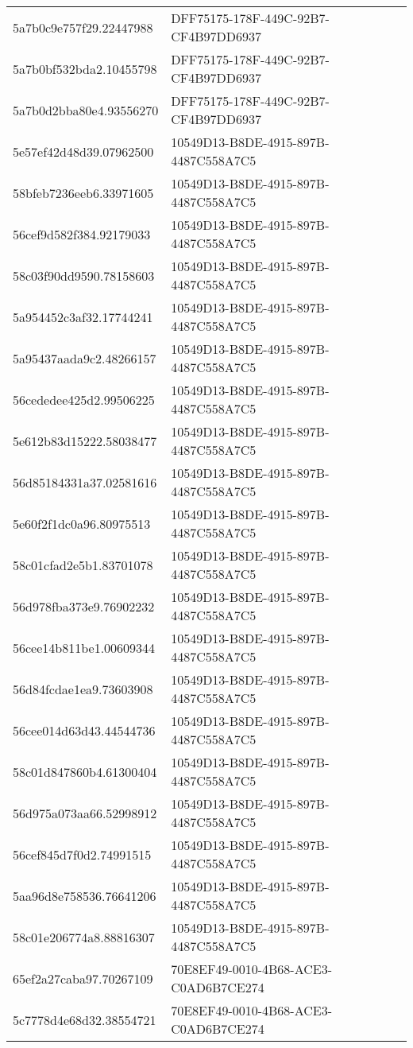 \begin{tabular}{ll}
5a7b0c9e757f29.22447988 & DFF75175-178F-449C-92B7-CF4B97DD6937 \\
5a7b0bf532bda2.10455798 & DFF75175-178F-449C-92B7-CF4B97DD6937 \\
5a7b0d2bba80e4.93556270 & DFF75175-178F-449C-92B7-CF4B97DD6937 \\
5e57ef42d48d39.07962500 & 10549D13-B8DE-4915-897B-4487C558A7C5 \\
58bfeb7236eeb6.33971605 & 10549D13-B8DE-4915-897B-4487C558A7C5 \\
56cef9d582f384.92179033 & 10549D13-B8DE-4915-897B-4487C558A7C5 \\
58c03f90dd9590.78158603 & 10549D13-B8DE-4915-897B-4487C558A7C5 \\
5a954452c3af32.17744241 & 10549D13-B8DE-4915-897B-4487C558A7C5 \\
5a95437aada9c2.48266157 & 10549D13-B8DE-4915-897B-4487C558A7C5 \\
56cededee425d2.99506225 & 10549D13-B8DE-4915-897B-4487C558A7C5 \\
5e612b83d15222.58038477 & 10549D13-B8DE-4915-897B-4487C558A7C5 \\
56d85184331a37.02581616 & 10549D13-B8DE-4915-897B-4487C558A7C5 \\
5e60f2f1dc0a96.80975513 & 10549D13-B8DE-4915-897B-4487C558A7C5 \\
58c01cfad2e5b1.83701078 & 10549D13-B8DE-4915-897B-4487C558A7C5 \\
56d978fba373e9.76902232 & 10549D13-B8DE-4915-897B-4487C558A7C5 \\
56cee14b811be1.00609344 & 10549D13-B8DE-4915-897B-4487C558A7C5 \\
56d84fcdae1ea9.73603908 & 10549D13-B8DE-4915-897B-4487C558A7C5 \\
56cee014d63d43.44544736 & 10549D13-B8DE-4915-897B-4487C558A7C5 \\
58c01d847860b4.61300404 & 10549D13-B8DE-4915-897B-4487C558A7C5 \\
56d975a073aa66.52998912 & 10549D13-B8DE-4915-897B-4487C558A7C5 \\
56cef845d7f0d2.74991515 & 10549D13-B8DE-4915-897B-4487C558A7C5 \\
5aa96d8e758536.76641206 & 10549D13-B8DE-4915-897B-4487C558A7C5 \\
58c01e206774a8.88816307 & 10549D13-B8DE-4915-897B-4487C558A7C5 \\
65ef2a27caba97.70267109 & 70E8EF49-0010-4B68-ACE3-C0AD6B7CE274 \\
5c7778d4e68d32.38554721 & 70E8EF49-0010-4B68-ACE3-C0AD6B7CE274 \\

\end{tabular}

